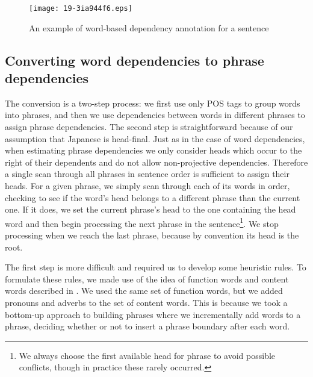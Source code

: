 \documentclass[english]{jnlp_1.4}
\def\secref#1{}
\begin{document}
\begin{figure}[b]
  \begin{center}
\texttt{[image: 19-3ia944f6.eps]}
  \end{center}
  \caption{An example of word-based dependency annotation for a sentence}
  \label{figure:word_cabocha}
\end{figure}



\subsection{Converting word dependencies to phrase dependencies}
\label{sec:conv-word-depend}

The conversion is a two-step process: we first use only POS tags to
group words into phrases, and then we use dependencies between words
in different phrases to assign phrase dependencies. The second step is
straightforward because of our assumption that Japanese is
head-final. Just as in the case of word dependencies, when estimating
phrase dependencies we only consider heads which occur to the right of
their dependents and do not allow non-projective
dependencies. Therefore a single scan through all phrases in sentence
order is sufficient to assign their heads. For a given phrase, we
simply scan through each of its words in order, checking to see if the
word's head belongs to a different phrase than the current one. If it
does, we set the current phrase's head to the one containing the head
word and then begin processing the next phrase in the
sentence\footnote{We always choose the first available head for phrase
to avoid possible conflicts, though in practice these rarely
occurred.}. We stop processing when we reach the last phrase, because
by convention its head is the root.

The first step is more difficult and required us to develop some
heuristic rules. To formulate these rules, we made use of the idea
of function words and content words described in
\secref{sec:conversion_rules}. We used the same set of function words,
but we added pronouns and adverbs to the set of content words. This is
because we took a bottom-up approach to building phrases where we
incrementally add words to a phrase, deciding whether or not to insert
a phrase boundary after each word.
\end{document}
